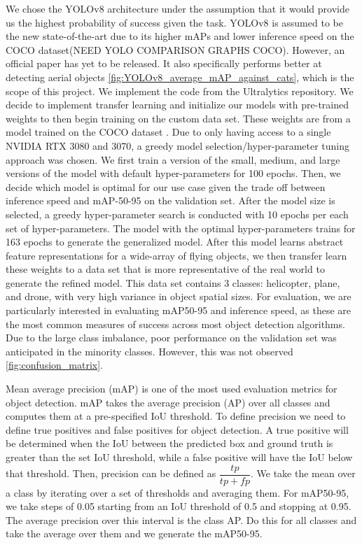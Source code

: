 \documentclass[10pt,twocolumn,letterpaper]{article}
\begin{document}
We chose the YOLOv8 architecture under the assumption that it would provide us the highest probability of success given the task. YOLOv8 is 
assumed to be the new state-of-the-art due to its higher mAPs and lower inference speed on the COCO dataset(NEED YOLO COMPARISON GRAPHS COCO). However, an official paper has 
yet to be released. It also specifically performs better at detecting aerial objects \ref{fig:YOLOv8_average_mAP_against_cats}, which is the scope of this project. We implement the code
from the Ultralytics repository. We decide to implement transfer learning and initialize our models with pre-trained weights to then begin training on the 
custom data set. These weights are from a model trained on the COCO dataset \cite{coco}. Due to only having access to a single NVIDIA RTX 3080 and 3070, 
a greedy model selection/hyper-parameter tuning approach was chosen. We first train a version of the small, medium, and large versions of the 
model with default hyper-parameters for 100 epochs. Then, we decide which model is optimal for our use case given the trade off between inference 
speed and mAP-50-95 on the validation set. After the model size is selected, a greedy hyper-parameter search is conducted with 10 epochs per each 
set of hyper-parameters. The model with the optimal hyper-parameters trains for 163 epochs to generate the generalized model. After this model learns abstract feature representations for a wide-array of flying objects, we then transfer learn these weights to a data set that is more representative of the real world \cite{TransferDataset} to generate the refined model. This data set contains 3 classes: helicopter, plane, and drone, with very high variance in object spatial sizes. For evaluation, we are particularly interested in evaluating mAP50-95 and inference speed, as these are the most common measures of success across most object detection algorithms. Due to the large class imbalance, poor performance on the validation set was anticipated in the minority classes. However, this was not observed \ref{fig:confusion_matrix}.

Mean average precision (mAP) is one of the most used evaluation metrics for object detection. mAP takes the average precision (AP) over all classes and computes them at a pre-specified IoU threshold. To define precision we need to define true positives and false positives for object detection. A true positive will be determined when the IoU between the predicted box and ground truth is greater than the set IoU threshold, while a false positive will have the IoU below that threshold. Then, precision can be defined as $\dfrac{tp}{tp+fp}$. We take the mean over a class by iterating over a set of thresholds and averaging them. For mAP50-95, we take steps of 0.05 starting from an IoU threshold of 0.5 and stopping at 0.95. The average precision over this interval is the class AP. Do this for all classes and take the average over them and we generate the mAP50-95.
\end{document}
